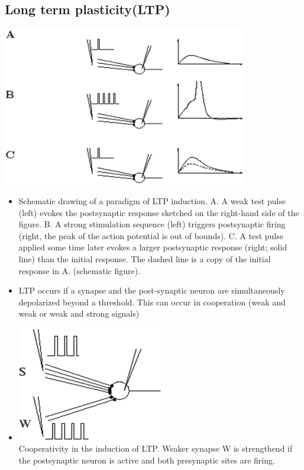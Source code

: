 \documentclass[english,11pt]{article}
\begin{document}
\subsection{Long term plasticity(LTP)}
\includegraphics[width=0.8\textwidth]{LTP.png}
\begin{itemize}
\item Schematic drawing of a paradigm of LTP induction. \subitem A. A weak test pulse (left) evokes the postsynaptic response sketched on the right-hand side of the figure. 
\subitem B. A strong stimulation sequence (left) triggers postsynaptic firing (right, the peak of the action potential is out of bounds). 
\subitem C. A test pulse applied some time later evokes a larger postsynaptic response (right; solid line) than the initial response. The dashed line is a copy of the initial response in A. (schematic figure).
\item LTP occurs if a synapse and the post-synaptic neuron are simultaneously depolarized beyond a threshold. This can occur in cooperation (weak and weak or weak and strong signals)
\item \includegraphics[width=0.5\textwidth]{LTP-coop.png}\\
Cooperativity in the induction of LTP. Weaker synapse W is strengthend if the postsynaptic neuron is active and both presynaptic sites are firing.
\end{itemize}
\end{document}
